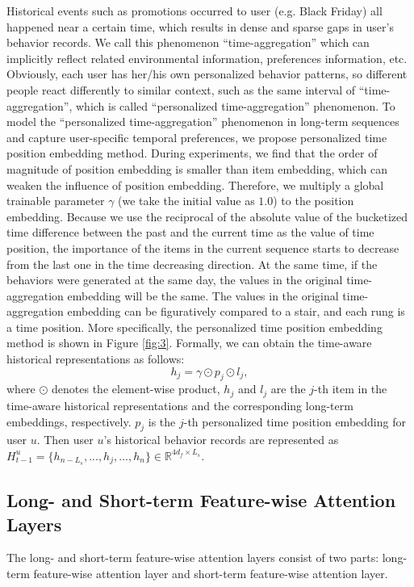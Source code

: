 \documentclass[preprint,12pt]{elsarticle}
\begin{document}
\begin{sloppypar}
Historical events such as promotions occurred to user (e.g. Black Friday) all happened near a certain time, which results in dense and sparse gaps in user's behavior records. We call this phenomenon ``time-aggregation'' which can implicitly reflect related environmental information, preferences information, etc. Obviously, each user has her/his own personalized behavior patterns, so different people react differently to similar context, such as the same interval of ``time-aggregation'', which is called ``personalized time-aggregation'' phenomenon. To model the ``personalized time-aggregation'' phenomenon in long-term sequences and capture user-specific temporal preferences, we propose personalized time position embedding method. During experiments, we find that the order of magnitude of position embedding is smaller than item embedding, which can weaken the influence of position embedding. Therefore, we multiply a global trainable parameter $\gamma$ (we take the initial value as $1.0$) to the position embedding. Because we use the reciprocal of the absolute value of the bucketized time difference between the past and the current time as the value of time position, the importance of the items in the current sequence starts to decrease from the last one in the time decreasing direction. At the same time, if the behaviors were generated at the same day, the values in the original time-aggregation embedding will be the same. The values in the original time-aggregation embedding can be figuratively compared to a stair, and each rung is a time position. More specifically, the personalized time position embedding method is shown in Figure \ref{fig:3}. Formally, we can obtain the time-aware historical representations as follows:
\begin{equation}
h_j = \gamma \odot p_j \odot l_j,
\end{equation}
where $\odot$ denotes the element-wise product, $h_j$ and $l_j$ are the $j$-th item in the time-aware historical representations and the corresponding long-term embeddings, respectively. $p_j$ is the $j$-th personalized time position embedding for user $u$. Then user $u$'s historical behavior records are represented as $H^u_{t-1}=\{h_{n-L_s},...,h_j,...,h_n\}\in \mathbb{R}^{4d_{f}\times L_s}$.

\subsection{Long- and Short-term Feature-wise Attention Layers}
The long- and short-term feature-wise attention layers consist of two parts: long-term feature-wise attention layer and short-term feature-wise attention layer.

\end{sloppypar}
\end{document}

